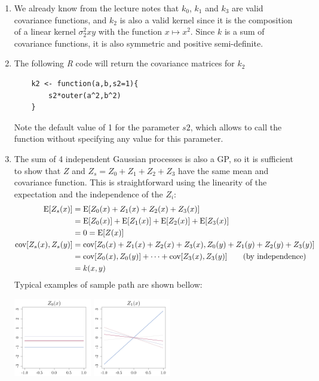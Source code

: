 \documentclass[a4paper,10pt]{article}
\newcommand{\E}{\mbox{E}}
\newcommand{\cov}{\mbox{cov}}
\begin{document}
\begin{enumerate}[label=Q\arabic*.]
\item  We already know from the lecture notes that $k_0$, $k_1$ and $k_3$ are valid covariance functions, and $k_2$ is also a valid kernel since it is the composition of a linear kernel $\sigma_2^2 xy$ with the function $x \mapsto x^2 $. Since $k$ is a sum of covariance functions, it is also symmetric and positive semi-definite.  
\item The following \emph{R} code will return the covariance matrices for $k_2$
\begin{Verbatim}
	k2 <- function(a,b,s2=1){
	    s2*outer(a^2,b^2)
	}
\end{Verbatim}
Note the default value of 1 for the parameter $s2$, which allows to call the function without specifying any value for this parameter.
\item The sum of 4 independent Gaussian processes is also a GP, so it is sufficient to show that $Z$ and $Z_s = Z_0+Z_1+Z_2+Z_3$ have the same mean and covariance function. This is straightforward using the linearity of the expectation and the independence of the $Z_i$:
\begin{align*}
\E [Z_s(x)] &= \E [Z_0(x) + Z_1(x) + Z_2(x) + Z_3(x)] \\
&= \E[Z_0(x)] + \E[Z_1(x)] + \E[Z_2(x)] + \E[Z_3(x)] \\
&= 0 = \E[Z(x)]\\
\cov [Z_s(x),Z_s(y)] &= \cov [ Z_0(x) + Z_1(x) + Z_2(x) + Z_3(x) , Z_0(y) + Z_1(y) + Z_2(y) + Z_3(y)]\\
&= \cov [Z_0(x),Z_0(y)] + \dots + \cov [Z_3(x),Z_3(y)] \text{\qquad (by independence)}\\
&= k(x,y)
\end{align*}
Typical examples of sample path are shown bellow:
\begin{center}
  \includegraphics[width=3.4cm]{figures/samplesZ0.pdf}
  \includegraphics[width=3.4cm]{figures/samplesZ1.pdf} 

\end{center}
\end{enumerate}
\end{document}
